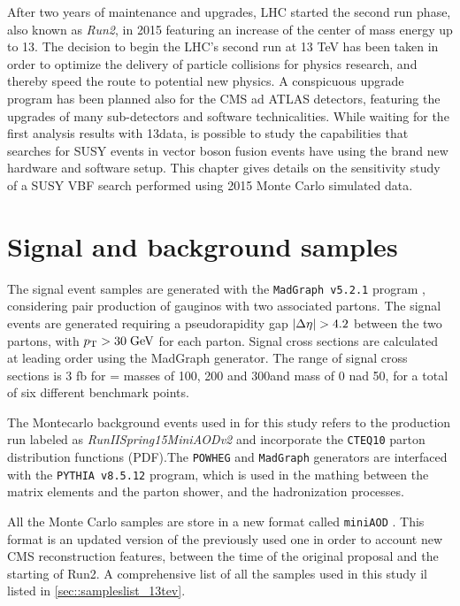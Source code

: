 

After two years of maintenance and upgrades, LHC started the second run phase, also known as \textit{Run2}, in 2015 featuring an increase of the center of mass energy up to 13\tev. The decision to begin the LHC’s second run at 13 TeV has been taken in order to optimize the delivery of particle collisions for physics research, and thereby speed the route to potential new physics. A conspicuous upgrade program has been planned also for the CMS ad ATLAS detectors, featuring the upgrades of many sub-detectors and software technicalities. While waiting for the first analysis results with 13\tev data, is possible to study the capabilities that searches for SUSY events in vector boson fusion events have using the brand new hardware and software setup. This chapter gives details on the sensitivity study of a SUSY VBF search performed using 2015 Monte Carlo simulated data.

\section{Signal and background samples}

The signal event samples are generated with the \texttt{MadGraph v5.2.1} program \cite{Alwall:2011uj}, considering pair production of gauginos with two associated partons. The signal events are generated requiring a pseudorapidity gap $|\Delta\eta| > 4.2$ between the two partons, with $p_{\text{T}} > 30\;\text{Ge}\kern-0.06667em\text{V}$ for each parton. Signal cross sections are calculated at leading order using the MadGraph generator. The range of signal cross sections is $3$ fb for \charginopm = \neutralinotwo masses of 100, 200 and 300\gev and \neutralinoone mass of 0 nad 50\gev, for a total of six different benchmark points.

The Montecarlo background events used in for this study refers to the production run labeled as \textit{RunIISpring15MiniAODv2} and incorporate the \texttt{CTEQ10} \cite{Dulat:2013hea} parton distribution functions (PDF).The \texttt{POWHEG} and \texttt{MadGraph} generators are interfaced with the \texttt{PYTHIA v8.5.12} \cite{Sjostrand:2006za} program, which is used in the mathing between the matrix elements and the parton shower, and the hadronization processes. 

All the Monte Carlo samples are store in a new format called \texttt{miniAOD} \cite{bib:WorkBookMiniAOD}. This format is an updated version of the previously used one in order to account new CMS reconstruction features, between the time of the original proposal and the starting of Run2. A comprehensive list of all the samples used in this study il listed in \autoref{sec::sampleslist_13tev}.

